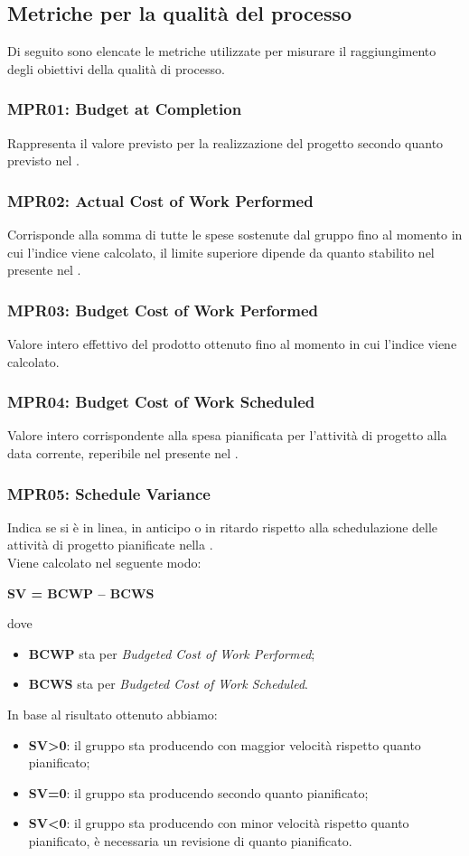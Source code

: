 \subsection{Metriche per la qualità del processo}
Di seguito sono elencate le metriche utilizzate per misurare il raggiungimento degli obiettivi della qualità di processo.
\subsubsection{MPR01: Budget at Completion}
Rappresenta il valore previsto per la realizzazione del progetto secondo quanto previsto nel .
\subsubsection{MPR02: Actual Cost of Work Performed}
Corrisponde alla somma di tutte le spese sostenute dal gruppo fino al momento in cui l'indice viene calcolato, il limite superiore dipende da quanto stabilito nel  presente nel .
\subsubsection{MPR03: Budget Cost of Work Performed}
Valore intero effettivo del prodotto ottenuto fino al momento in cui l'indice viene calcolato.
\subsubsection{MPR04: Budget Cost of Work Scheduled}
Valore intero corrispondente alla spesa pianificata per l'attività di progetto alla data corrente, reperibile nel  presente nel .
\subsubsection{MPR05: Schedule Variance}
Indica se si è in linea, in anticipo o in ritardo rispetto alla schedulazione delle attività di progetto pianificate nella .\\
Viene calcolato nel seguente modo:
\begin{center}
	\textbf{SV = BCWP – BCWS}
\end{center}
dove 
\begin{itemize}
	\item \textbf{BCWP} sta per \textit{Budgeted Cost of Work Performed};
	\item \textbf{BCWS} sta per \textit{Budgeted Cost of Work Scheduled}.
\end{itemize}
In base al risultato ottenuto abbiamo:
\begin{itemize}
	\item \textbf{SV>0}: il gruppo sta producendo con maggior velocità rispetto quanto pianificato;
	\item \textbf{SV=0}: il gruppo sta producendo secondo quanto pianificato;
	\item \textbf{SV<0}: il gruppo sta producendo con minor velocità rispetto quanto pianificato, è necessaria un revisione di quanto pianificato.
\end{itemize}
